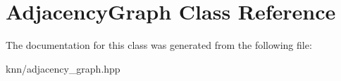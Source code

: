 \hypertarget{classAdjacencyGraph}{}\section{Adjacency\+Graph Class Reference}
\label{classAdjacencyGraph}


The documentation for this class was generated from the following file\+:\begin{DoxyCompactItemize}
\item 
knn/adjacency\+\_\+graph.\+hpp\end{DoxyCompactItemize}
